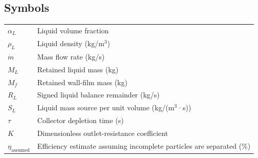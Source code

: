 \clearpage
\subsection*{Symbols}

\addtocounter{table}{-1}
\renewcommand{\theHtable}{glossary-2}
\begin{longtable}{@{}>{\raggedright\arraybackslash}p{0.29000000\dimexpr\linewidth-2\tabcolsep\relax}>{\raggedright\arraybackslash}p{0.71000000\dimexpr\linewidth-2\tabcolsep\relax}@{}}
\(\alpha_L\) & Liquid volume fraction \\
\(\rho_L\) & Liquid density (kg/m\(^{3}\)) \\
\(\dot m\) & Mass flow rate (kg/s) \\
\(M_L\) & Retained liquid mass (kg) \\
\(M_f\) & Retained wall-film mass (kg) \\
\(R_L\) & Signed liquid balance remainder (kg/s) \\
\(S_L\) & Liquid mass source per unit volume (kg/(m\(^{3}\)·s)) \\
\(\tau\) & Collector depletion time (s) \\
\(K\) & Dimensionless outlet-resistance coefficient \\
\(\eta_{\mathrm{assumed}}\) & Efficiency estimate assuming incomplete particles are separated (\%) \\
\bottomrule
\end{longtable}
\renewcommand{\theHtable}{\arabic{table}}
